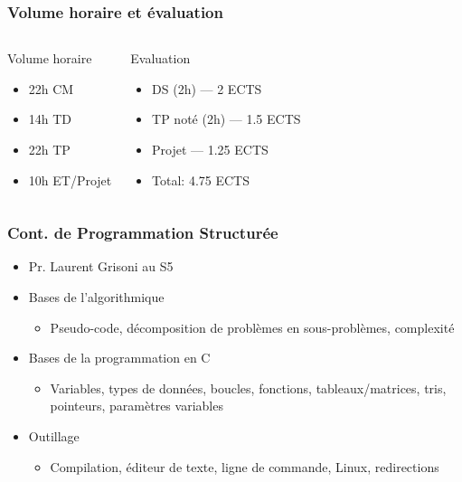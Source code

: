 \documentclass[12pt,svgnames]{beamer}
\begin{document}
\begin{frame}
	\frametitle{Volume horaire et évaluation}
	\begin{columns}
	\begin{block}{Volume horaire}
		\begin{itemize}
			\item 22h CM
			\item 14h TD
			\item 22h TP
			\item 10h ET/Projet
		\end{itemize}
	\end{block}{}

	\begin{block}{Evaluation}
		\begin{itemize}
			\item DS (2h) --- 2 ECTS
			\item TP noté (2h) --- 1.5 ECTS
			\item Projet --- 1.25 ECTS
			\item Total: 4.75 ECTS
		\end{itemize}
	\end{block}{}	
	\end{columns}
\end{frame}


\begin{frame}
	\frametitle{Cont. de Programmation Structurée }
	\begin{itemize}
		\item Pr. Laurent Grisoni au S5
		\item Bases de l'algorithmique
		\begin{itemize}
			\item Pseudo-code, décomposition de problèmes en sous-problèmes, complexité
		\end{itemize}

		\item Bases de la programmation en C
		\begin{itemize}
			\item Variables, types de données, boucles, fonctions, tableaux/matrices, tris, pointeurs, paramètres variables
		\end{itemize}
		\item Outillage
		\begin{itemize}
			\item Compilation, éditeur de texte, ligne de commande, Linux, redirections
		\end{itemize}
	\end{itemize}
\end{frame}
\end{document}
